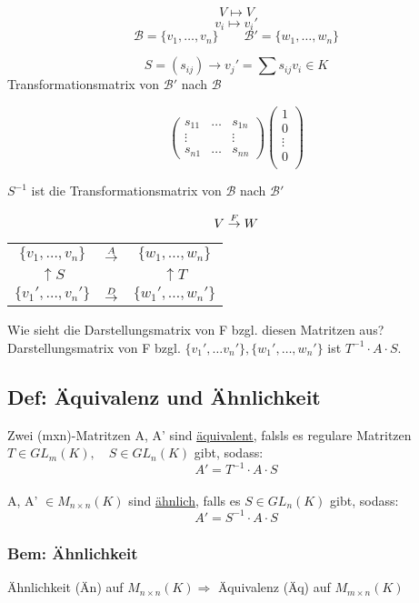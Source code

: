 \documentclass[titlepage,12pt,a4paper,ngerman]{report}
\begin{document}
$$V \mapsto V$$
$$v_i \mapsto v_i'$$
$$\mathcal{B} = \{v_1, \dots , v_n\} \qquad \mathcal{B}' = \{w_1,\dots , w_n\} $$

$$S=(s_{ij}) \rightarrow v_j'= \sum s_{ij} v_i \in K$$
Transformationsmatrix von $\mathcal{B'}$ nach $\mathcal{B}$

$$\begin{pmatrix}
s_{11} & \dots & s_{1n} \\
\vdots & & \vdots \\
s_{n1} & \dots & s_{nn}
\end{pmatrix} \begin{pmatrix}
1\\
0\\
\vdots \\
0\\
\end{pmatrix}$$

$S^{-1}$ ist die Transformationsmatrix von $\mathcal{B}$ nach $\mathcal{B'}$

$$V\buildrel F \over \to W$$
\begin{center}
	\begin{tabular}{ccc}
		$\{v_1,\dots,v_n\}$ & $\buildrel A \over \rightarrow$ & $\{w_1,\dots , w_n\}$ \\
		$\uparrow S$ &  & $\uparrow T$ \\
		$\{v_1',\dots, v_n'\}$ & $\buildrel D \over \rightarrow$ & $\{w_1',\dots, w_n'\}$
	\end{tabular}
\end{center}

Wie sieht die Darstellungsmatrix von F bzgl. diesen Matritzen aus?\\
Darstellungsmatrix von F bzgl. $\{v_1',\dots v_n'\} ,\{w_1',\dots ,w_n'\}$ ist $T^{-1} \cdot A \cdot S$.
\subsection{Def: Äquivalenz und Ähnlichkeit} Zwei (mxn)-Matritzen A, A' sind \underline{äquivalent}, falsls es regulare Matritzen $T\in GL_m(K),\quad S \in GL_n(K)$ gibt, sodass: $$A' = T^{-1} \cdot A \cdot S$$\\
A, A' $\in M_{n\times n}(K)$ sind \underline{ähnlich}, falls es $S \in GL_n(K)$ gibt, sodass: $$A' = S^{-1} \cdot A \cdot S$$

\subsubsection{Bem: Ähnlichkeit}
Ähnlichkeit (Än) auf $M_{n\times n}(K)\Rightarrow$ Äquivalenz (Äq) auf $M_{m\times n}(K)$
\end{document}

